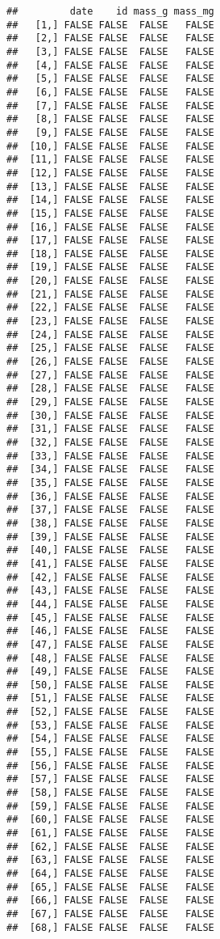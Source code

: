 \documentclass[
]{article}
\begin{document}
\begin{verbatim}
##         date    id mass_g mass_mg
##   [1,] FALSE FALSE  FALSE   FALSE
##   [2,] FALSE FALSE  FALSE   FALSE
##   [3,] FALSE FALSE  FALSE   FALSE
##   [4,] FALSE FALSE  FALSE   FALSE
##   [5,] FALSE FALSE  FALSE   FALSE
##   [6,] FALSE FALSE  FALSE   FALSE
##   [7,] FALSE FALSE  FALSE   FALSE
##   [8,] FALSE FALSE  FALSE   FALSE
##   [9,] FALSE FALSE  FALSE   FALSE
##  [10,] FALSE FALSE  FALSE   FALSE
##  [11,] FALSE FALSE  FALSE   FALSE
##  [12,] FALSE FALSE  FALSE   FALSE
##  [13,] FALSE FALSE  FALSE   FALSE
##  [14,] FALSE FALSE  FALSE   FALSE
##  [15,] FALSE FALSE  FALSE   FALSE
##  [16,] FALSE FALSE  FALSE   FALSE
##  [17,] FALSE FALSE  FALSE   FALSE
##  [18,] FALSE FALSE  FALSE   FALSE
##  [19,] FALSE FALSE  FALSE   FALSE
##  [20,] FALSE FALSE  FALSE   FALSE
##  [21,] FALSE FALSE  FALSE   FALSE
##  [22,] FALSE FALSE  FALSE   FALSE
##  [23,] FALSE FALSE  FALSE   FALSE
##  [24,] FALSE FALSE  FALSE   FALSE
##  [25,] FALSE FALSE  FALSE   FALSE
##  [26,] FALSE FALSE  FALSE   FALSE
##  [27,] FALSE FALSE  FALSE   FALSE
##  [28,] FALSE FALSE  FALSE   FALSE
##  [29,] FALSE FALSE  FALSE   FALSE
##  [30,] FALSE FALSE  FALSE   FALSE
##  [31,] FALSE FALSE  FALSE   FALSE
##  [32,] FALSE FALSE  FALSE   FALSE
##  [33,] FALSE FALSE  FALSE   FALSE
##  [34,] FALSE FALSE  FALSE   FALSE
##  [35,] FALSE FALSE  FALSE   FALSE
##  [36,] FALSE FALSE  FALSE   FALSE
##  [37,] FALSE FALSE  FALSE   FALSE
##  [38,] FALSE FALSE  FALSE   FALSE
##  [39,] FALSE FALSE  FALSE   FALSE
##  [40,] FALSE FALSE  FALSE   FALSE
##  [41,] FALSE FALSE  FALSE   FALSE
##  [42,] FALSE FALSE  FALSE   FALSE
##  [43,] FALSE FALSE  FALSE   FALSE
##  [44,] FALSE FALSE  FALSE   FALSE
##  [45,] FALSE FALSE  FALSE   FALSE
##  [46,] FALSE FALSE  FALSE   FALSE
##  [47,] FALSE FALSE  FALSE   FALSE
##  [48,] FALSE FALSE  FALSE   FALSE
##  [49,] FALSE FALSE  FALSE   FALSE
##  [50,] FALSE FALSE  FALSE   FALSE
##  [51,] FALSE FALSE  FALSE   FALSE
##  [52,] FALSE FALSE  FALSE   FALSE
##  [53,] FALSE FALSE  FALSE   FALSE
##  [54,] FALSE FALSE  FALSE   FALSE
##  [55,] FALSE FALSE  FALSE   FALSE
##  [56,] FALSE FALSE  FALSE   FALSE
##  [57,] FALSE FALSE  FALSE   FALSE
##  [58,] FALSE FALSE  FALSE   FALSE
##  [59,] FALSE FALSE  FALSE   FALSE
##  [60,] FALSE FALSE  FALSE   FALSE
##  [61,] FALSE FALSE  FALSE   FALSE
##  [62,] FALSE FALSE  FALSE   FALSE
##  [63,] FALSE FALSE  FALSE   FALSE
##  [64,] FALSE FALSE  FALSE   FALSE
##  [65,] FALSE FALSE  FALSE   FALSE
##  [66,] FALSE FALSE  FALSE   FALSE
##  [67,] FALSE FALSE  FALSE   FALSE
##  [68,] FALSE FALSE  FALSE   FALSE

\end{verbatim}
\end{document}
